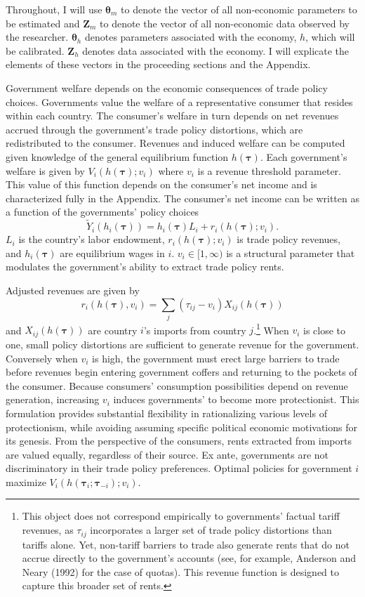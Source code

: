 \documentclass{puthesis}
\begin{document}
Throughout, I will use \(\bm{\theta}_m\) to denote the vector of all
non-economic parameters to be estimated and \(\bm{Z}_m\) to denote the
vector of all non-economic data observed by the researcher.
\(\bm{\theta}_h\) denotes parameters associated with the economy, \(h\),
which will be calibrated. \(\bm{Z}_h\) denotes data associated with the
economy. I will explicate the elements of these vectors in the
proceeding sections and the Appendix.

Government welfare depends on the economic consequences of trade policy
choices. Governments value the welfare of a representative consumer that
resides within each country. The consumer's welfare in turn depends on
net revenues accrued through the government's trade policy distortions,
which are redistributed to the consumer. Revenues and induced welfare
can be computed given knowledge of the general equilibrium function
\(h(\bm{\tau})\). Each government's welfare is given by
\(V_i \left( h(\bm{\tau}); v_i \right)\) where \(v_i\) is a revenue
threshold parameter. This value of this function depends on the
consumer's net income and is characterized fully in the Appendix. The
consumer's net income can be written as a function of the governments'
policy choices \[
\tilde{Y}_i(h_i(\bm{\tau}))  = h_i(\bm{\tau}) L_i + r_i(h(\bm{\tau}); v_i) . 
\] \(L_i\) is the country's labor endowment, \(r_i(h(\bm{\tau}); v_i)\)
is trade policy revenues, and \(h_i(\bm{\tau})\) are equilibrium wages
in \(i\). \(v_i \in [1, \infty)\) is a structural parameter that
modulates the government's ability to extract trade policy rents.

Adjusted revenues are given by \begin{equation} \label{eq:r}
r_i(h(\bm{\tau}), v_i) = \sum_j (\tau_{ij} - v_i) X_{ij}(h(\bm{\tau}))
\end{equation} and \(X_{ij}(h(\bm{\tau}))\) are country \(i\)'s imports
from country \(j\).\footnote{This object does not correspond empirically
  to governments' factual tariff revenues, as \(\tau_{ij}\) incorporates
  a larger set of trade policy distortions than tariffs alone. Yet,
  non-tariff barriers to trade also generate rents that do not accrue
  directly to the government's accounts (see, for example, Anderson and
  Neary (1992) for the case of quotas). This revenue function is
  designed to capture this broader set of rents.} When \(v_i\) is close
to one, small policy distortions are sufficient to generate revenue for
the government. Conversely when \(v_i\) is high, the government must
erect large barriers to trade before revenues begin entering government
coffers and returning to the pockets of the consumer. Because consumers'
consumption possibilities depend on revenue generation, increasing
\(v_i\) induces governments' to become more protectionist. This
formulation provides substantial flexibility in rationalizing various
levels of protectionism, while avoiding assuming specific political
economic motivations for its genesis. From the perspective of the
consumers, rents extracted from imports are valued equally, regardless
of their source. Ex ante, governments are not discriminatory in their
trade policy preferences. Optimal policies for government \(i\) maximize
\(V_i \left( h(\bm{\tau}_i; \bm{\tau}_{-i}); v_i \right)\).
\end{document}
